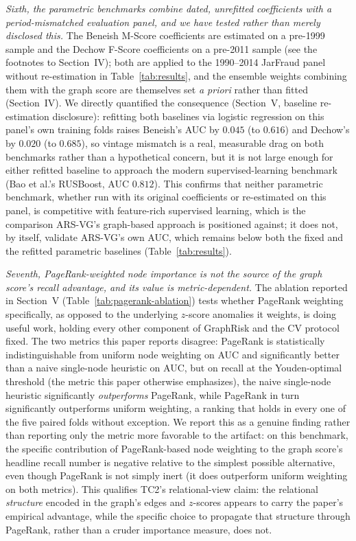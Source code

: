 \documentclass[12pt]{article}
\begin{document}
\emph{Sixth, the parametric benchmarks combine dated, unrefitted
coefficients with a period-mismatched evaluation panel, and we have
tested rather than merely disclosed this.}  The Beneish
M-Score coefficients are estimated on a pre-1999 sample and the Dechow
F-Score coefficients on a pre-2011 sample (see the footnotes to
Section~IV); both are applied to the 1990--2014 JarFraud panel without
re-estimation in Table~\ref{tab:results}, and the ensemble weights
combining them with the graph score are themselves set \textit{a
priori} rather than fitted (Section~IV).  We directly quantified the
consequence (Section~V, baseline re-estimation disclosure): refitting
both baselines via logistic regression on this panel's own training
folds raises Beneish's AUC by $0.045$ (to $0.616$) and Dechow's by
$0.020$ (to $0.685$), so vintage mismatch is a real, measurable drag on
both benchmarks rather than a hypothetical concern, but it is not large
enough for either refitted baseline to approach the modern
supervised-learning benchmark (Bao et al.'s RUSBoost, AUC $0.812$).
This confirms that neither parametric benchmark, whether run with its
original coefficients or re-estimated on this panel, is competitive
with feature-rich supervised learning, which is the comparison ARS-VG's
graph-based approach is positioned against; it does not, by itself,
validate ARS-VG's own AUC, which remains below both the fixed and the
refitted parametric baselines (Table~\ref{tab:results}).

\emph{Seventh, PageRank-weighted node importance is not the source of
the graph score's recall advantage, and its value is metric-dependent.}
The ablation reported in Section~V (Table~\ref{tab:pagerank-ablation})
tests whether PageRank weighting specifically, as opposed to the
underlying $z$-score anomalies it weights, is doing useful work,
holding every other component of GraphRisk and the CV protocol fixed.
The two metrics this paper reports disagree: PageRank is statistically
indistinguishable from uniform node weighting on AUC and significantly
better than a naive single-node heuristic on AUC, but on recall at the
Youden-optimal threshold (the metric this paper otherwise
emphasizes), the naive single-node heuristic significantly
\emph{outperforms} PageRank, while PageRank in turn significantly
outperforms uniform weighting, a ranking that holds in every one of
the five paired folds without exception.  We report this as a genuine
finding rather than reporting only the metric more favorable to the
artifact: on this benchmark, the specific contribution of
PageRank-based node weighting to the graph score's headline recall
number is negative relative to the simplest possible alternative,
even though PageRank is not simply inert (it does outperform uniform
weighting on both metrics).  This qualifies TC2's relational-view
claim: the relational \emph{structure} encoded in the graph's edges
and $z$-scores appears to carry the paper's empirical advantage, while
the specific choice to propagate that structure through PageRank,
rather than a cruder importance measure, does not.
\end{document}
